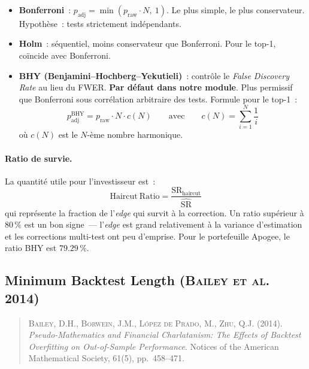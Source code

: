 \begin{itemize}
\item \textbf{Bonferroni}~: $p_{\text{adj}} = \min(p_{\text{raw}} \cdot N,\ 1)$. Le plus simple, le plus conservateur. Hypothèse~: tests strictement indépendants.
\item \textbf{Holm}~: séquentiel, moins conservateur que Bonferroni. Pour le top-1, coïncide avec Bonferroni.
\item \textbf{BHY (Benjamini--Hochberg--Yekutieli)}~: contrôle le \emph{False Discovery Rate} au lieu du FWER. \textbf{Par défaut dans notre module}. Plus permissif que Bonferroni sous corrélation arbitraire des tests. Formule pour le top-1~:
\begin{equation}
p_{\text{adj}}^{\text{BHY}} = p_{\text{raw}} \cdot N \cdot c(N)
\qquad\text{avec}\qquad
c(N) = \sum_{i=1}^{N} \frac{1}{i}
\label{eq:bhy_correction}
\end{equation}
où $c(N)$ est le $N$-ème nombre harmonique.
\end{itemize}

\paragraph{Ratio de survie.} La quantité utile pour l'investisseur est~:
\begin{equation}
\mathrm{Haircut\ Ratio} = \frac{\mathrm{SR}_{\text{haircut}}}{\widehat{\mathrm{SR}}}
\label{eq:haircut_ratio}
\end{equation}
qui représente la fraction de l'\emph{edge} qui survit à la correction. Un ratio supérieur à $80\,\%$ est un bon signe~--- l'\emph{edge} est grand relativement à la variance d'estimation et les corrections multi-test ont peu d'emprise. Pour le portefeuille Apogee, le ratio BHY est $79.29\,\%$.

\subsection{Minimum Backtest Length (\textsc{Bailey et al.} 2014)}
\label{app:minbtl}

\begin{quote}\small
\textsc{Bailey}, D.H., \textsc{Borwein}, J.M., \textsc{L\'opez de Prado}, M., \textsc{Zhu}, Q.J. (2014). \emph{Pseudo-Mathematics and Financial Charlatanism: The Effects of Backtest Overfitting on Out-of-Sample Performance}. Notices of the American Mathematical Society, 61(5), pp.~458--471.
\end{quote}

